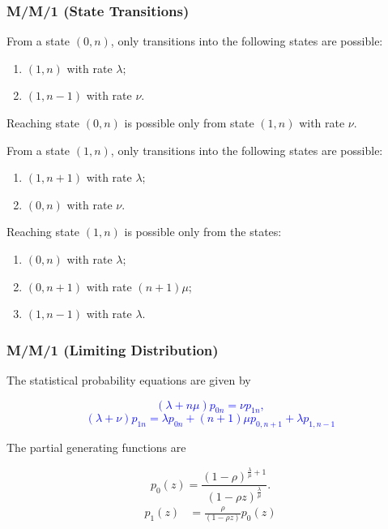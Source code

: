 \documentclass{beamer}
\def \mp {\pause}
\def \mp {}
\newcommand{\ft}[1]{\frametitle{#1}}
\newcommand{\tcb}[1]{\textcolor{blue}{#1}}
\begin{document}
\begin{frame}
\ft{M/M/1 (State Transitions)} 
    From a state $(0, n)$, only transitions into the following states are possible:
\begin{enumerate}

\item $(1, n)$ with rate $\lambda$;
\item $(1, n - 1)$ with rate $\nu$.
\end{enumerate}

Reaching state $(0, n)$ is possible only from state $(1, n)$ with rate $\nu$.

From a state $(1, n)$, only transitions into the following states are possible:
\begin{enumerate}
\item $(1, n + 1)$ with rate $\lambda$;
\item $(0, n)$ with rate $\nu$.
\end{enumerate}

Reaching state $(1,n)$ is possible only from the states: \\

  \begin{enumerate}
    \item $(0,n)$ with rate $\lambda$; 
    \item $(0,n+1)$ with rate $(n+1)\mu$; 
    \item $(1, n-1)$ with rate $\lambda$.
  \end{enumerate}
\end{frame}

\begin{frame}
\ft{M/M/1 (Limiting Distribution)} 
The statistical probability equations are given by
\mp
\begin{tcolorbox}
\tcb{\[(\lambda+n\mu)p_{0n}=\nu p_{1n},\]
  \[(\lambda+\nu)p_{1n}=\lambda p_{0n}+(n+1)\mu p_{0,n+1}+\lambda p_{1,n-1} \]} 
\end{tcolorbox}
\mp 
The partial generating functions are
\begin{tcolorbox}
    \[p_{0}(z)=\frac{(1-\rho)^{\frac{\lambda}{\mu}+1}}{(1-\rho z)^{\frac{\lambda}{\mu}}}.\]    
    \begin{align*}
    p_{1}(z)&=\frac{\rho}{(1-\rho z)}p_0(z)
  \end{align*}
    \end{tcolorbox}
\end{frame}
\end{document}
